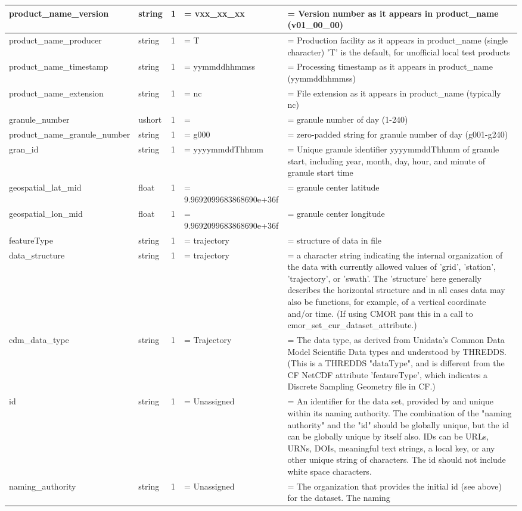 \begin{center}
\begin{xltabular}{1.1\textwidth}{|m{4cm}|l|l|
>{\hsize\linewidth=\hsize}X|
>{\hsize\linewidth=\hsize}X|
}
product\_name\_version & string & 1 & vxx\_xx\_xx & Version number as it
appears in product\_name (v01\_00\_00)\tabularnewline\hline
product\_name\_producer & string & 1 & T & Production facility as it
appears in product\_name (single character) 'T' is the default, for
unofficial local test products\tabularnewline\hline
product\_name\_timestamp & string & 1 & yymmddhhmmss & Processing
timestamp as it appears in product\_name (yymmddhhmmss)\tabularnewline\hline
product\_name\_extension & string & 1 & nc & File extension as it
appears in product\_name (typically nc)\tabularnewline\hline
granule\_number & ushort & 1 & & granule number of day
(1-240)\tabularnewline\hline
product\_name\_granule\_number & string & 1 & g000 & zero-padded string
for granule number of day (g001-g240)\tabularnewline\hline
gran\_id & string & 1 & yyyymmddThhmm & Unique granule identifier
yyyymmddThhmm of granule start, including year, month, day, hour, and
minute of granule start time\tabularnewline\hline
geospatial\_lat\_mid & float & 1 & 9.9692099683868690e+36f & granule
center latitude\tabularnewline\hline
geospatial\_lon\_mid & float & 1 & 9.9692099683868690e+36f & granule
center longitude\tabularnewline\hline
featureType & string & 1 & trajectory & structure of data in
file\tabularnewline\hline
data\_structure & string & 1 & trajectory & a character string
indicating the internal organization of the data with currently allowed
values of 'grid', 'station', 'trajectory', or 'swath'. The 'structure'
here generally describes the horizontal structure and in all cases data
may also be functions, for example, of a vertical coordinate and/or
time. (If using CMOR pass this in a call to
cmor\_set\_cur\_dataset\_attribute.)\tabularnewline\hline
cdm\_data\_type & string & 1 & Trajectory & The data type, as derived
from Unidata's Common Data Model Scientific Data types and understood by
THREDDS. (This is a THREDDS "dataType", and is different from the CF
NetCDF attribute 'featureType', which indicates a Discrete Sampling
Geometry file in CF.)\tabularnewline\hline
id & string & 1 & Unassigned & An identifier for the data set, provided
by and unique within its naming authority. The combination of the
"naming authority" and the "id" should be globally unique, but the id
can be globally unique by itself also. IDs can be URLs, URNs, DOIs,
meaningful text strings, a local key, or any other unique string of
characters. The id should not include white space
characters.\tabularnewline\hline
naming\_authority & string & 1 & Unassigned & The organization that
provides the initial id (see above) for the dataset. The naming

\end{xltabular}
\end{center}
